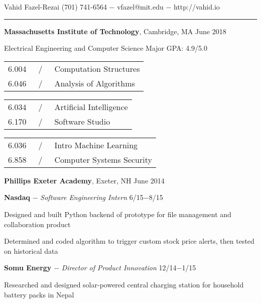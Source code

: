 \documentclass[11pt]{article}
\newcommand{\msection}[1]{\vspace{1em}\marginnote{#1}} %
\newcommand{\bt}[1]{\textbf{#1}} %
\newcommand{\gap}[0]{\vspace{0.5em}} %
\newcommand{\dash}[0]{ $-$ } %
\newcommand{\tabsep}[0]{\, / \,} %
\begin{document}

{\Huge Vahid Fazel-Rezai} \hfill  (701) 741-6564\dash vfazel@mit.edu\dash http://vahid.io

\vspace{0.2em}

\hspace{-1.2in}\rule{7.9in}{0.2em}

\vspace{-0.4em}



\msection{Education}

\bt{Massachusetts Institute of Technology}, Cambridge, MA \hfill June 2018

Electrical Engineering and Computer Science \hfill Major GPA: 4.9/5.0 

\vspace{0.15em}\begin{tabular}{rcl}
6.004 & \tabsep & Computation Structures \\
6.046 & \tabsep & Analysis of Algorithms
\end{tabular}
\hfill
\begin{tabular}{rcl}
6.034 & \tabsep & Artificial Intelligence \\
6.170 & \tabsep & Software Studio
\end{tabular}
\hfill
\begin{tabular}{rcl}
6.036 & \tabsep & Intro Machine Learning \\
6.858 & \tabsep & Computer Systems Security
\end{tabular}

\gap

\bt{Phillips Exeter Academy}, Exeter, NH \hfill June 2014



\msection{Work}


\bt{Nasdaq}\dash \emph{Software Engineering Intern} \hfill 6/15$-$8/15

Designed and built Python backend of prototype for file management and collaboration product

Determined and coded algorithm to trigger custom stock price alerts, then tested on historical data

\gap

\bt{Somu Energy}\dash \emph{Director of Product Innovation} \hfill 12/14$-$1/15

Researched and designed solar-powered central charging station for household battery packs in Nepal
\end{document}
